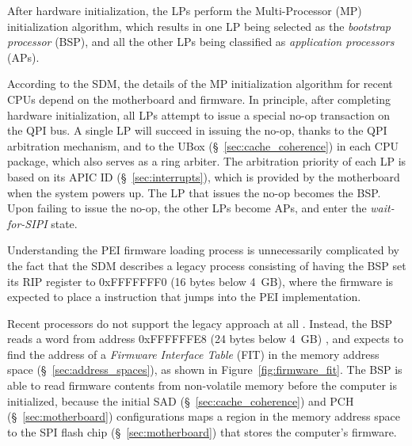 After hardware initialization, the LPs perform the Multi-Processor (MP)
initialization algorithm, which results in one LP being selected as the
\textit{bootstrap processor} (BSP), and all the other LPs being classified as
\textit{application processors} (APs).

According to the SDM, the details of the MP initialization algorithm for recent
CPUs depend on the motherboard and firmware. In principle, after completing
hardware initialization, all LPs attempt to issue a special no-op transaction
on the QPI bus. A single LP will succeed in issuing the no-op, thanks to
the QPI arbitration mechanism, and to the UBox (\S~\ref{sec:cache_coherence})
in each CPU package, which also serves as a ring arbiter. The arbitration
priority of each LP is based on its APIC ID (\S~\ref{sec:interrupts}), which is
provided by the motherboard when the system powers up. The LP that issues the
no-op becomes the BSP. Upon failing to issue the no-op, the other LPs become
APs, and enter the \textit{wait-for-SIPI} state.


Understanding the PEI firmware loading process is unnecessarily complicated by
the fact that the SDM describes a legacy process consisting of having the BSP
set its RIP register to 0xFFFFFFF0 (16 bytes below 4~GB), where the firmware is
expected to place a instruction that jumps into the PEI implementation.


Recent processors do not support the legacy approach at all
\cite{reinauer2013fitpatch}. Instead, the BSP reads a word from address
0xFFFFFFE8 (24 bytes below 4~GB) \cite{intel2012uefihypervisor, datta2013acm},
and expects to find the address of a \textit{Firmware Interface Table} (FIT)
in the memory address space (\S~\ref{sec:address_spaces}), as shown in
Figure~\ref{fig:firmware_fit}. The BSP is able to read firmware contents from
non-volatile memory before the computer is initialized, because the initial SAD
(\S~\ref{sec:cache_coherence}) and PCH (\S~\ref{sec:motherboard})
configurations maps a region in the memory address space to the SPI flash chip
(\S~\ref{sec:motherboard}) that stores the computer's firmware.

